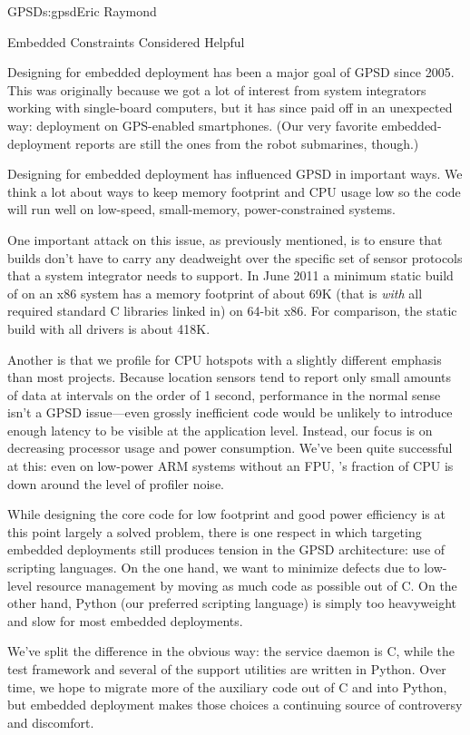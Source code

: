 \begin{aosachapter}{GPSD}{s:gpsd}{Eric Raymond}
\begin{aosasect1}{Embedded Constraints Considered Helpful}

Designing for embedded deployment has been a major goal of GPSD since
2005. This was originally because we got a lot of interest from system
integrators working with single-board computers, but it has since paid
off in an unexpected way: deployment on GPS-enabled smartphones. (Our
very favorite embedded-deployment reports are still the ones from the
robot submarines, though.)

Designing for embedded deployment has influenced GPSD in important
ways.  We think a lot about ways to keep memory footprint and CPU
usage low so the code will run well on low-speed, small-memory,
power-constrained systems.

One important attack on this issue, as previously mentioned, is to
ensure that  builds don't have to carry any deadweight over
the specific set of sensor protocols that a system integrator needs to
support. In June 2011 a minimum static build of  on an x86
system has a memory footprint of about 69K (that is \emph{with} all
required standard C libraries linked in) on 64-bit x86. For
comparison, the static build with all drivers is about 418K.

Another is that we profile for CPU hotspots with a slightly different
emphasis than most projects. Because location sensors tend to report
only small amounts of data at intervals on the order of 1 second,
performance in the normal sense isn't a GPSD issue---even grossly
inefficient code would be unlikely to introduce enough latency to be
visible at the application level.  Instead, our focus is on decreasing
processor usage and power consumption.  We've been quite successful at
this: even on low-power ARM systems without an FPU, 's
fraction of CPU is down around the level of profiler noise.

While designing the core code for low footprint and good power
efficiency is at this point largely a solved problem, there is one
respect in which targeting embedded deployments still produces tension
in the GPSD architecture: use of scripting languages. On the one hand,
we want to minimize defects due to low-level resource management by
moving as much code as possible out of C.  On the other hand, Python
(our preferred scripting language) is simply too heavyweight and slow
for most embedded deployments.

We've split the difference in the obvious way: the  service
daemon is C, while the test framework and several of the support
utilities are written in Python. Over time, we hope to migrate more of
the auxiliary code out of C and into Python, but embedded deployment
makes those choices a continuing source of controversy and discomfort.


\end{aosasect1}
\end{aosachapter}
